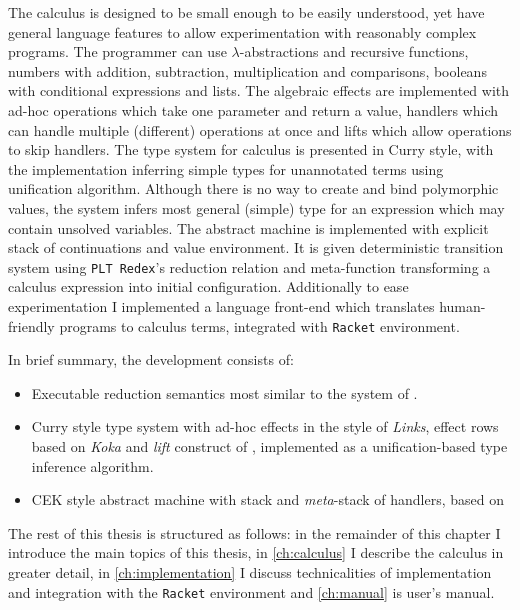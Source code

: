 \documentclass[inz, english, shortabstract]{iithesis}
\newcommand{\Redex}{\texttt{PLT Redex}}
\newcommand{\Racket}{\texttt{Racket}}
\begin{document}
The calculus is designed to be small enough to be easily understood, yet have general language features to allow experimentation with reasonably complex programs.
The programmer can use $\lambda$-abstractions and recursive functions, numbers with addition, subtraction, multiplication and comparisons, booleans with conditional expressions and lists.
The algebraic effects are implemented with ad-hoc operations which take one parameter and return a value, handlers which can handle multiple (different) operations at once and lifts which allow operations to skip handlers.
The type system for calculus is presented in Curry style, with the implementation inferring simple types for unannotated terms using unification algorithm.
Although there is no way to create and bind polymorphic values, the system infers most general (simple) type for an expression which may contain unsolved variables.
The abstract machine is implemented with explicit stack of continuations and value environment.
It is given deterministic transition system using \Redex{}'s reduction relation and meta-function transforming a calculus expression into initial configuration.
Additionally to ease experimentation I implemented a language front-end which translates human-friendly programs to calculus terms, integrated with \Racket{} environment.

In brief summary, the development consists of:
\begin{itemize}
  \item Executable reduction semantics most similar to the system of \cite{Biernacki2017}.
  \item Curry style type system with ad-hoc effects in the style of \emph{Links}, effect rows based on \emph{Koka} and \emph{lift} construct of \cite{Biernacki2017}, implemented as a unification-based type inference algorithm.
  \item CEK style abstract machine with stack and \emph{meta}-stack of handlers, based on \cite{Hillerstrom2016}
\end{itemize}

The rest of this thesis is structured as follows: in the remainder of this chapter I introduce the main topics of this thesis, in \autoref{ch:calculus} I describe the calculus in greater detail, in \autoref{ch:implementation} I discuss technicalities of implementation and integration with the \Racket{} environment and \autoref{ch:manual} is user's manual.
\end{document}
